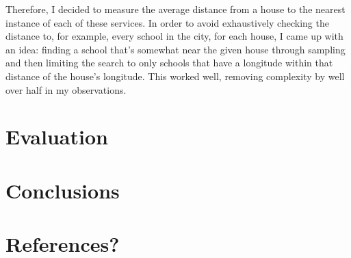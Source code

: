 \documentclass[11pt]{article} %
\begin{document}
Therefore, I decided to measure the average distance from a house to the nearest instance of each of these services. In order to avoid exhaustively checking the distance to, for example, every school in the city, for each house, I came up with an idea: finding a school that's somewhat near the given house through sampling and then limiting the search to only schools that have a longitude within that distance of the house's longitude. This worked well, removing complexity by well over half in my observations.



\section{Evaluation}

\section{Conclusions}

\section{References?}
\printbibliography
\end{document}
